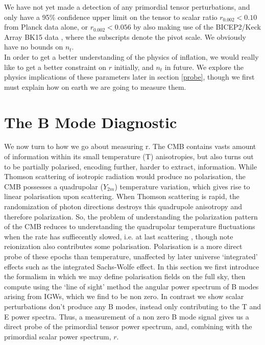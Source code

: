 \documentclass[a4paper,10pt]{article}
\begin{document}
We have not yet made a detection of any primordial tensor perturbations, and only have a 95\% confidence upper limit on the tensor to scalar ratio $r_{0.002}<0.10$ from Planck data alone, or $r_{0.002}<0.056$ by also making use of the BICEP2/Keck Array BK15 data \cite{Planck-inflation}, where the subscripts denote the pivot scale. We obviously have no bounds on $n_t$.\\

In order to get a better understanding of the physics of inflation, we would really like to get a better constraint on $r$ initially, and $n_t$ in future. We explore the physics implications of these parameters later in section \ref{probe}, though we first must explain how on earth we are going to measure them.

\newpage

\section{The B Mode Diagnostic}

We now turn to how we go about measuring r. The CMB contains vasts amount of information within its small temperature (T) anisotropies, but also turns out to be partially polarised, encoding further, harder to extract, information. While Thomson scattering of isotropic radiation would produce no polarisation, the CMB possesses a quadrupolar ($Y_{2m}$) temperature variation, which gives rise to linear polarisation upon scattering. When Thomson scattering is rapid, the randomization of photon directions destroys this quadrupole anisotropy and therefore polarization. So, the problem of understanding the polarization pattern of the CMB reduces to understanding the quadrupolar temperature fluctuations when the rate has suffiecently slowed, i.e. at last scattering \cite{hu}, though note reionization also contributes some polarisation. Polarisation is a more direct probe of these epochs than temperature, unaffected by later universe `integrated' effects such as the integrated Sachs-Wolfe effect. In this section we first introduce the formalism in which we may define polarisation fields on the full sky, then compute using the `line of sight' method the angular power spectrum of B modes arising from IGWs, which we find to be non zero. In contrast we show scalar perturbations don't produce any B modes, instead only contributing to the T and E power spectra. Thus, a measurement of a non zero B mode signal gives us a direct probe of the primordial tensor power spectrum, and, combining with the primordial scalar power spectrum, $r$. 
\end{document}
